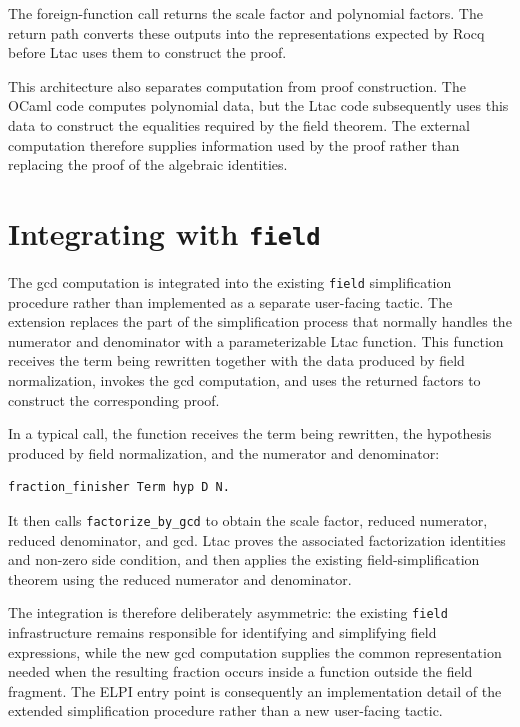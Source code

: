 \documentclass[11pt]{article}
\begin{document}
The foreign-function call returns the scale factor and polynomial factors. The return path converts these outputs into the representations expected by Rocq before Ltac uses them to construct the proof.


This architecture also separates computation from proof construction. The
OCaml code computes polynomial data, but the Ltac code subsequently uses
this data to construct the equalities required by the field theorem. The
external computation therefore supplies information used by the proof
rather than replacing the proof of the algebraic identities.

\section{Integrating with \texttt{field}}


The gcd computation is integrated into the existing \texttt{field}
simplification procedure rather than implemented as a separate user-facing
tactic. The extension replaces the part of the simplification process that
normally handles the numerator and denominator with a parameterizable Ltac
function. This function receives the term being rewritten together with the
data produced by field normalization, invokes the gcd computation, and uses
the returned factors to construct the corresponding proof.

In a typical call, the function receives the term being rewritten, the
hypothesis produced by field normalization, and the numerator and denominator:
\begin{lstlisting}[language=ML]
fraction_finisher Term hyp D N.
\end{lstlisting}

It then calls \texttt{factorize\_by\_gcd} to obtain the scale factor, reduced
numerator, reduced denominator, and gcd. Ltac proves the associated
factorization identities and non-zero side condition, and then applies the
existing field-simplification theorem using the reduced numerator and
denominator.

The integration is therefore deliberately asymmetric: the existing
\texttt{field} infrastructure remains responsible for identifying and
simplifying field expressions, while the new gcd computation supplies the
common representation needed when the resulting fraction occurs inside a
function outside the field fragment. The ELPI entry point is consequently an
implementation detail of the extended simplification procedure rather than a
new user-facing tactic.
\end{document}
